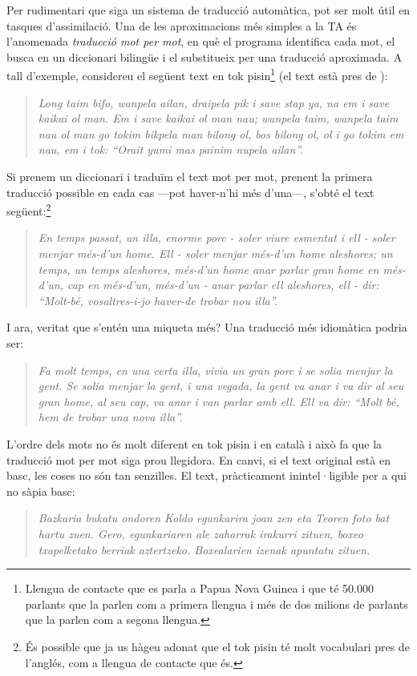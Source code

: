 Per rudimentari que siga un sistema de traducció automàtica, pot ser
molt útil en tasques d'assimilació. Una de les aproximacions més
simples a la TA és l'anomenada \emph{traducció mot per
  mot}\label{pg:mpm}, en què el programa identifica cada mot, el busca
en un diccionari bilingüe i el substitueix per una traducció
aproximada. A tall d'exemple, considereu el següent text en tok
pisin\footnote{Llengua de contacte que es parla a Papua Nova Guinea i
  que té 50.000 parlants que la parlen com a primera llengua i més de
  dos milions de parlants que la parlen com a segona llengua.} (el
text està pres de \citealt{lyovin97b}):
\begin{quote}{\sl Long taim bifo, wanpela ailan, draipela pik i save
    stap ya, na em i save kaikai ol man. Em i save kaikai ol man nau;
    wanpela taim, wanpela taim nau ol man go tokim bikpela man bilong
    ol, bos bilong ol, ol i go tokim em nau, em i tok: ``Orait yumi
    mas painim nupela ailan''. }
\end{quote} 
Si prenem un diccionari i traduïm el text mot per mot, prenent la
primera traducció possible en cada cas ---pot haver-n'hi més d'una---,
s'obté el text següent:\footnote{És possible que ja us hàgeu adonat
  que el tok pisin té molt vocabulari pres de l'anglés, com a llengua
  de contacte que és.}
\begin{quote}{\sl En temps passat, un illa, enorme porc - soler viure
    esmentat i ell - soler menjar més-d'un home. Ell - soler menjar
    més-d'un home aleshores; un temps, un temps aleshores, més-d'un
    home anar parlar gran home en més-d'un, cap en més-d'un, més-d'un
    - anar parlar ell aleshores, ell - dir: ``Molt-bé, vosaltres-i-jo
    haver-de trobar nou illa''.}
\end{quote}
I ara, veritat que s'entén una miqueta més? Una traducció
més idiomàtica podria ser:
\begin{quote}{\sl Fa molt temps, en una certa illa, vivia un gran porc
    i se solia menjar la gent. Se solia menjar la gent, i una vegada,
    la gent va anar i va dir al seu gran home, al seu cap, va anar i
    van parlar amb ell. Ell va dir: ``Molt bé, hem de trobar una nova
    illa''.}
\end{quote}
L'ordre dels mots no és molt diferent en tok pisin i en català i això
fa que la traducció mot per mot siga prou llegidora. En canvi, si el
text original està en basc, les coses no són tan senzilles. El text,
pràcticament inintel·ligible per a qui no sàpia basc:
\begin{quote}{\sl Bazkaria bukatu ondoren Koldo egunkarira joan zen
    eta Teoren foto bat hartu zuen. Gero, egunkariaren ale zaharrak
    irakurri zituen, boxeo txapelketako berriak
    aztertzeko. Boxealarien izenak apuntatu zituen.}
\end{quote}
